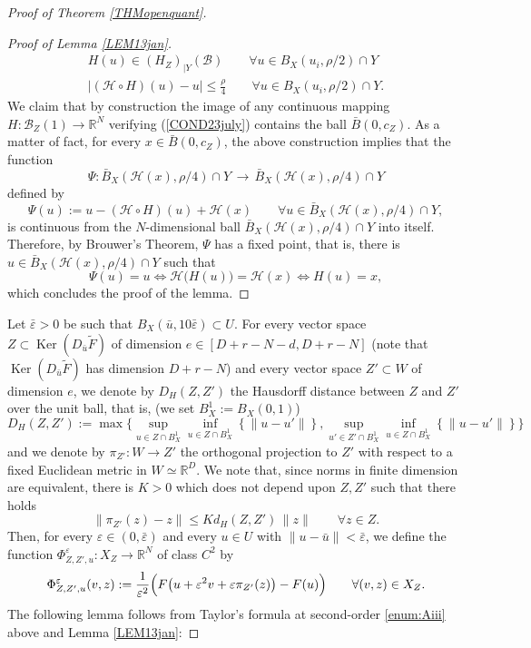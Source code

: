 \documentclass[JEP,XML,SOM,Unicode,NoFloatCountersInSection,published]{cedram}
\let\epsilon\varepsilon
\DeclareMathOperator{\Ker}{Ker}
\newcommand\R{\mathbb R}
\theoremstyle{definition}
\begin{document}
\begin{proof}[Proof of Theorem \ref{THMopenquant}]
\begin{proof}[Proof of Lemma \ref{LEM13jan}]
\begin{gather*}
H(u) \in (H_Z)_{\vert Y} (\mathcal{B}) \qquad \forall u \in B_X(u_i,\rho/2) \cap Y
\\
\tag*{and}
\left|(\mathcal{H} \circ H)(u) -u \right| \leq \frac{\rho}{4} \qquad \forall u\in B_X(u_i,\rho/2) \cap Y.
\end{gather*}
We claim that by construction the image of any continuous mapping $H : \mathcal{B}_Z(1) \to \R^N$ verifying (\ref{COND23july}) contains the ball $\bar{B}(0,c_Z)$. As a matter of fact, for every $x\in \bar{B}(0,c_Z)$, the above construction implies that the function
\[
\Psi : \bar{B}_X(\mathcal{H}(x),\rho/4) \cap Y \, \to \, \bar{B}_X(\mathcal{H}(x),\rho/4)\cap Y
\]
defined by
\[
\Psi (u) := u -(\mathcal{H} \circ H) (u) + \mathcal{H}(x) \qquad \forall u \in \bar{B}_X(\mathcal{H}(x),\rho/4) \cap Y,
\]
is continuous from the $N$-dimensional ball $\bar{B}_X(\mathcal{H}(x),\rho/4)\cap Y$ into itself. Therefore, by Brouwer's Theorem, $\Psi$ has a fixed point, that is, there is $u \in \bar{B}_X(\mathcal{H}(x),\rho/4)\cap Y$ such that
\[
\Psi(u) = u \iff \mathcal{H}\bigl(H(u)\bigr) = \mathcal{H}(x) \iff H(u)=x,
\]
which concludes the proof of the lemma.
\end{proof}

Let $\bar{\epsilon}>0$ be such that $B_X(\bar{u},10\bar{\epsilon})\subset U$. For every vector space $Z\subset \Ker (D_{\bar{u}} \tilde{F})$ of dimension $e \in [D+r-N-d,D+r-N]$ (note that $ \Ker (D_{\bar{u}} \tilde{F})$ has dimension $D+r-N$) and every vector space $Z'\subset W$ of dimension $e$, we denote by $D_H(Z,Z')$ the Hausdorff distance between $Z$ and $Z'$ over the unit ball, that is, (we set $B_X^1:=B_X(0,1)$)
\[
D_H(Z,Z') := \max \biggl\{ \sup_{u\in Z\cap B_X^1} \inf _{u\in Z\cap B_X^1} \left\{ \|u-u'\|\right\}, \sup_{u'\in Z'\cap B_X^1} \inf _{u\in Z\cap B_X^1} \left\{ \|u-u'\| \right\}\biggr\}
\]
and we denote by $\pi_{Z'} : W \to Z'$ the orthogonal projection to $Z'$ with respect to a fixed Euclidean metric in $W\simeq \R^D$. We note that, since norms in finite dimension are equivalent, there is $K>0$ which does not depend upon $Z, Z'$ such that there holds
\begin{equation}\label{14janvroma}
\left\|\pi_{Z'} (z) -z \right\| \leq K d_H(Z,Z') \, \|z\| \qquad \forall z \in Z.
\end{equation}
Then, for every $\epsilon \in (0,\bar{\epsilon})$ and every $u\in U$ with $\|u-\bar{u}\|<\bar{\epsilon}$, we define the function $\Phi_{Z,Z',u}^{\epsilon}:X_Z \to \R^N$ of class $C^2$ by
\[
\Phi_{Z,Z',u}^{\epsilon} (v,z) :=\frac{1}{\epsilon^2} \Bigl(F \bigl(u + \epsilon^2 v +\epsilon \pi_{Z'}(z) \bigr)-F(u) \Bigr) \qquad \forall (v,z) \in X_Z.
\]
The following lemma follows from Taylor's formula at second-order \eqref{enum:Aiii} above and Lemma \ref{LEM13jan}:


\end{proof}
\end{document}
